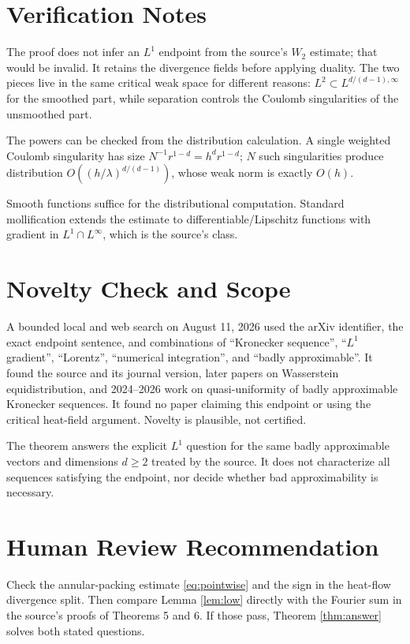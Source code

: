 \documentclass[11pt]{amsart}
\begin{document}
\section*{Verification Notes}

The proof does not infer an $L^1$ endpoint from the source's $W_2$ estimate;
that would be invalid.  It retains the divergence fields before applying
duality.  The two pieces live in the same critical weak space for different
reasons: $L^2\subset L^{d/(d-1),\infty}$ for the smoothed part, while
separation controls the Coulomb singularities of the unsmoothed part.

The powers can be checked from the distribution calculation.  A single
weighted Coulomb singularity has size $N^{-1}r^{1-d}=h^dr^{1-d}$; $N$
such singularities produce distribution
$O((h/\lambda)^{d/(d-1)})$, whose weak norm is exactly $O(h)$.

Smooth functions suffice for the distributional computation.  Standard
mollification extends the estimate to differentiable/Lipschitz functions
with gradient in $L^1\cap L^\infty$, which is the source's class.

\section*{Novelty Check and Scope}

A bounded local and web search on August 11, 2026 used the arXiv identifier,
the exact endpoint sentence, and combinations of ``Kronecker sequence'',
``$L^1$ gradient'', ``Lorentz'', ``numerical integration'', and ``badly
approximable''.  It found the source and its journal version, later papers
on Wasserstein equidistribution, and 2024--2026 work on quasi-uniformity of
badly approximable Kronecker sequences.  It found no paper claiming this
endpoint or using the critical heat-field argument.  Novelty is plausible,
not certified.

The theorem answers the explicit $L^1$ question for the same
badly approximable vectors and dimensions $d\geq2$ treated by the source.
It does not characterize all sequences satisfying the endpoint, nor decide
whether bad approximability is necessary.

\section*{Human Review Recommendation}

Check the annular-packing estimate \eqref{eq:pointwise} and the sign in the
heat-flow divergence split.  Then compare Lemma \ref{lem:low} directly with
the Fourier sum in the source's proofs of Theorems 5 and 6.  If those pass,
Theorem \ref{thm:answer} solves both stated questions.
\end{document}
